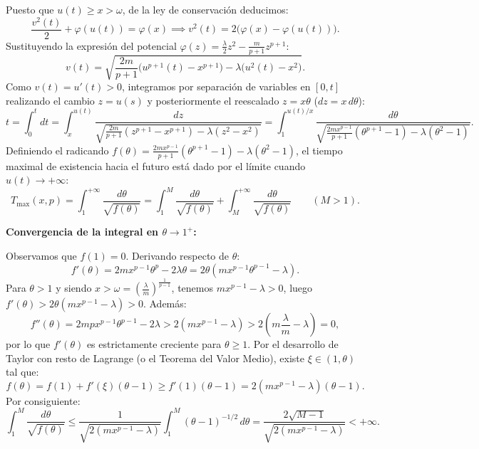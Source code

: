 {\begin{itemize}
            Puesto que $u(t) \ge x > \omega$, de la ley de conservación deducimos:
        \[
            \frac{v^2(t)}{2} + \varphi(u(t)) = \varphi(x) \implies v^2(t) = 2\big(\varphi(x) - \varphi(u(t))\big).
        \]
        Sustituyendo la expresión del potencial $\varphi(z) = \frac{\lambda}{2} z^2 - \frac{m}{p+1} z^{p+1}$:
        \[
            v(t) = \sqrt{\frac{2m}{p+1}\big(u^{p+1}(t) - x^{p+1}\big) - \lambda\big(u^2(t) - x^2\big)}.
        \]
        Como $v(t) = u'(t) > 0$, integramos por separación de variables en $[0, t]$ realizando el cambio $z = u(s)$ y posteriormente el reescalado $z = x\theta$ ($dz = x\,d\theta$):
        \[
            t = \int_0^t dt = \int_x^{u(t)} \frac{dz}{\sqrt{\frac{2m}{p+1}(z^{p+1} - x^{p+1}) - \lambda(z^2 - x^2)}} = \int_1^{u(t)/x} \frac{d\theta}{\sqrt{\frac{2m x^{p-1}}{p+1}(\theta^{p+1} - 1) - \lambda(\theta^2 - 1)}}.
        \]
        Definiendo el radicando $f(\theta) = \frac{2m x^{p-1}}{p+1}(\theta^{p+1} - 1) - \lambda(\theta^2 - 1)$, el tiempo maximal de existencia hacia el futuro está dado por el límite cuando $u(t) \to +\infty$:
        \[
            T_{\max}(x, p) = \int_1^{+\infty} \frac{d\theta}{\sqrt{f(\theta)}} = \int_1^M \frac{d\theta}{\sqrt{f(\theta)}} + \int_M^{+\infty} \frac{d\theta}{\sqrt{f(\theta)}} \qquad (M > 1).
        \]

        \textbf{Convergencia de la integral en $\theta \to 1^+$:}
        
        Observamos que $f(1) = 0$. Derivando respecto de $\theta$:
        \[
            f'(\theta) = 2m x^{p-1}\theta^p - 2\lambda\theta = 2\theta(m x^{p-1}\theta^{p-1} - \lambda).
        \]
        Para $\theta > 1$ y siendo $x > \omega = \left(\frac{\lambda}{m}\right)^{\frac{1}{p-1}}$, tenemos $m x^{p-1} - \lambda > 0$, luego $f'(\theta) > 2\theta(m x^{p-1} - \lambda) > 0$. Además:
        \[
            f''(\theta) = 2m p x^{p-1}\theta^{p-1} - 2\lambda > 2(m x^{p-1} - \lambda) > 2\left(m \frac{\lambda}{m} - \lambda\right) = 0,
        \]
        por lo que $f'(\theta)$ es estrictamente creciente para $\theta \ge 1$. Por el desarrollo de Taylor con resto de Lagrange (o el Teorema del Valor Medio), existe $\xi \in (1, \theta)$ tal que:
        \[
            f(\theta) = f(1) + f'(\xi)(\theta - 1) \ge f'(1)(\theta - 1) = 2(mx^{p-1} - \lambda)(\theta - 1).
        \]
        Por consiguiente:
        \[
            \int_1^M \frac{d\theta}{\sqrt{f(\theta)}} \le \frac{1}{\sqrt{2(mx^{p-1} - \lambda)}} \int_1^M (\theta - 1)^{-1/2}\,d\theta = \frac{2\sqrt{M-1}}{\sqrt{2(mx^{p-1} - \lambda)}} < +\infty.
        \]


\end{itemize}}
